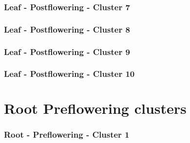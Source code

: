 \vspace{1em}



\clearpage

\subsubsection{Leaf - Postflowering - Cluster 7}

\vspace{1em}



\clearpage

\subsubsection{Leaf - Postflowering - Cluster 8}

\vspace{1em}



\clearpage

\subsubsection{Leaf - Postflowering - Cluster 9}

\vspace{1em}



\clearpage

\subsubsection{Leaf - Postflowering - Cluster 10}

\vspace{1em}



\clearpage

\section{Root Preflowering clusters}

\subsubsection{Root - Preflowering - Cluster 1}

